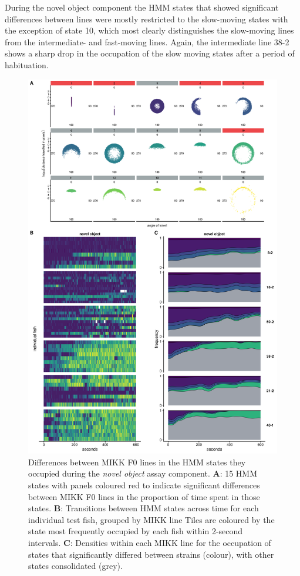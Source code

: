 \documentclass[
]{book}
\begin{document}
During the novel object component the HMM states that showed significant differences between lines were mostly restricted to the slow-moving states with the exception of state 10, which most clearly distinguishes the slow-moving lines from the intermediate- and fast-moving lines. Again, the intermediate line \textcolor{38-2_00C08B}{38-2} shows a sharp drop in the occupation of the slow moving states after a period of habituation.



\begin{figure}
\includegraphics[width=1\linewidth]{figs/mikk_behaviour/select_0.08_15_dge_no} \caption{Differences between MIKK F0 lines in the HMM states they occupied during the \emph{novel object} assay component. \textbf{A}: 15 HMM states with panels coloured red to indicate significant differences between MIKK F0 lines in the proportion of time spent in those states. \textbf{B}: Transitions between HMM states across time for each individual test fish, grouped by MIKK line Tiles are coloured by the state most frequently occupied by each fish within 2-second intervals. \textbf{C}: Densities within each MIKK line for the occupation of states that significantly differed between strains (colour), with other states consolidated (grey).}\label{fig:F2-time-dge-no}
\end{figure}
\end{document}
